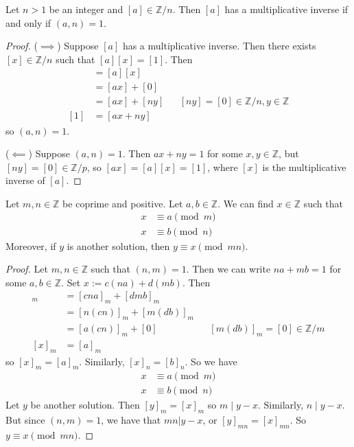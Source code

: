\documentclass [12pt] {article}
\newcommand{\Z}{\mathbb{Z}}
\newenvironment{theorem}[1]{\begin{tcolorbox}[title={Theorem #1},colback=green!5!white,colframe=black!75!green]}{\end{tcolorbox}}
\begin{document}
\begin{theorem}{}
    Let $n > 1$ be an integer and $[a] \in \Z/n$. Then $[a]$ has a multiplicative inverse if and
    only if $(a, n) = 1$.
\end{theorem}
\begin{proof}
    ($\implies$)
    Suppose $[a]$ has a multiplicative inverse. Then there exists $[x] \in \Z/n$ such that 
    $[a][x] = [1]$. Then
    \begin{align*}
        [1] &= [a][x] \\
            &= [ax] + [0] \\ 
            &= [ax] + [ny] && [ny] = [0] \in \Z/n, y \in \Z \\
        [1] &= [ax + ny] 
    \end{align*}
    so $(a, n) = 1$.
    \vspace{0.5em}

    ($\impliedby$)
    Suppose $(a, n) = 1$. Then $ax + ny = 1$ for some $x, y \in \Z$, but $[ny] = [0] \in \Z/p$, so 
    $[ax] = [a][x] = [1]$, where $[x]$ is the multiplicative inverse of $[a]$.
\end{proof}

\begin{theorem}{Chinese Remainder Theorem}
    Let $m, n \in \Z$ be coprime and positive. Let $a, b \in \Z$. We can find $x \in \Z$ such that
    \begin{align*}
        x &\equiv a \pmod{m} \\
        x &\equiv b \pmod{n}
    \end{align*}
    Moreover, if $y$ is another solution, then $y \equiv x \pmod{mn}$.
\end{theorem}
\begin{proof}
    Let $m, n \in \Z$ such that $(n, m) = 1$. Then we can write $na + mb = 1$ for some $a, b \in \Z$.
    Set $x := c(na) + d(mb)$. Then
    \begin{align*}
        [x]_m &= [cna]_m + [dmb]_m \\ 
              &= [n(cn)]_m + [m(db)]_m \\ 
              &= [a(cn)]_m + [0] && [m(db)]_m = [0] \in \Z/m \\ 
        [x]_m &= [a]_m 
    \end{align*}
    so $[x]_m = [a]_m$. Similarly, $[x]_n = [b]_n$. So we have
    \begin{align*}
        x &\equiv a \pmod{m} \\
        x &\equiv b \pmod{n}
    \end{align*}
    Let $y$ be another solution. Then $[y]_m = [x]_m$ so $m \mid y - x$. Similarly, $n \mid y - x$.
    But since $(n, m) = 1$, we have that $mn | y - x$, 
    or $[y]_{mn} = [x]_{mn}$. So $y \equiv x \pmod{mn}$.
\end{proof}
\end{document}
